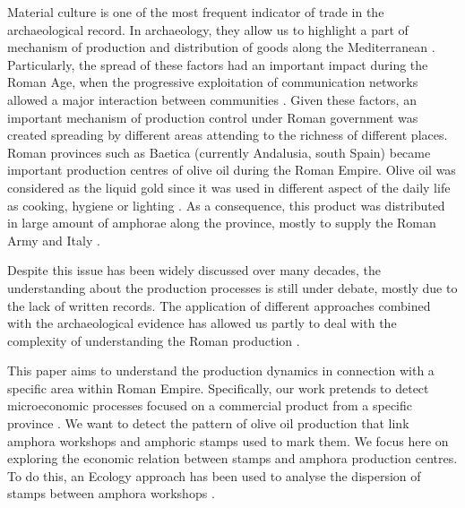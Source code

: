 \documentclass[review]{elsarticle}
\begin{document}
Material culture is one of the most frequent indicator of trade in the archaeological record. In archaeology, they allow us to highlight a part of mechanism of production and distribution of goods along the Mediterranean \citep{bevan_mediterranean_2014}. Particularly, the spread of these factors had an important impact during the Roman Age, when the progressive exploitation of communication networks allowed a major interaction between communities \citep{orengo_seeds_2016}. Given these factors, an important mechanism of production control under Roman government was created spreading by different areas attending to the richness of different places. Roman provinces such as Baetica (currently Andalusia, south Spain) became important production centres of olive oil during the Roman Empire. Olive oil was considered as the liquid gold since it was used in different aspect of the daily life as cooking, hygiene or lighting  \citep{mattingly_d.j._oil_1988}. As a consequence, this product was distributed in large amount of amphorae along the province, mostly to supply the Roman Army and Italy \citep{blazquez_exportacion_1980}. 


Despite this issue has been widely discussed over many decades, the understanding about the production processes is still under debate, mostly due to the lack of written records. The application of different approaches combined with the archaeological evidence has allowed us partly to deal with the complexity of understanding the Roman production \citep{orengo_seeds_2016,brughmans_roman_2016,coto-sarmiento_maria_bayesian_????}.

This paper aims to understand the production dynamics in connection with a specific area within Roman Empire. Specifically, our work pretends to detect microeconomic processes focused on a commercial product from a specific province \citep{isaksen_network_2006}. We want to detect the pattern of olive oil production that link amphora workshops and amphoric stamps used to mark them. We focus here on exploring the economic relation between stamps and amphora production centres. To do this, an Ecology approach has been used to analyse the dispersion of stamps between amphora workshops \citep{rubio-campillo_ecology_2018}. 


 
\end{document}
